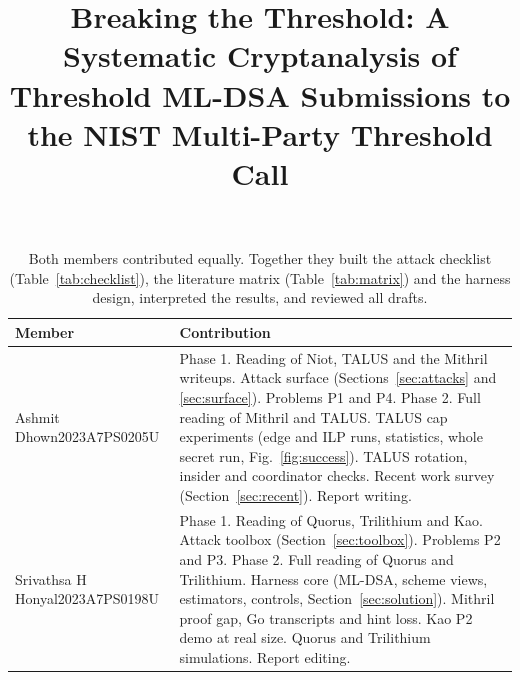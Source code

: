 \documentclass[10pt,conference,a4paper]{IEEEtran}
\begin{document}
\title{Breaking the Threshold: A Systematic Cryptanalysis of Threshold ML-DSA
Submissions to the NIST Multi-Party Threshold Call}

\author{
}

\maketitle

\begin{table}[h]
\centering
\renewcommand{\arraystretch}{1.3}
\begin{tabular}{|p{3.2cm}|p{4.6cm}|}
\hline
\textbf{Member} & \textbf{Contribution} \\
\hline
Ashmit Dhown\newline 2023A7PS0205U &
  Phase 1. Reading of Niot, TALUS and the Mithril writeups. Attack surface (Sections~\ref{sec:attacks} and
  \ref{sec:surface}). Problems P1 and P4.
  Phase 2. Full reading of Mithril and TALUS. TALUS cap experiments (edge and ILP runs, statistics, whole secret run,
  Fig.~\ref{fig:success}). TALUS rotation, insider and coordinator checks. Recent work survey (Section~\ref{sec:recent}).
  Report writing. \\
\hline
Srivathsa H Honyal\newline 2023A7PS0198U &
  Phase 1. Reading of Quorus, Trilithium and Kao. Attack toolbox (Section~\ref{sec:toolbox}). Problems P2 and P3.
  Phase 2. Full reading of Quorus and Trilithium. Harness core (ML-DSA, scheme views, estimators, controls,
  Section~\ref{sec:solution}). Mithril proof gap, Go transcripts and hint loss. Kao P2 demo at real size. Quorus and
  Trilithium simulations. Report editing. \\
\hline
\end{tabular}
\caption*{\footnotesize Both members contributed equally. Together they built the attack checklist
(Table~\ref{tab:checklist}), the literature matrix (Table~\ref{tab:matrix}) and the harness design, interpreted the
results, and reviewed all drafts.}
\end{table}
\end{document}
